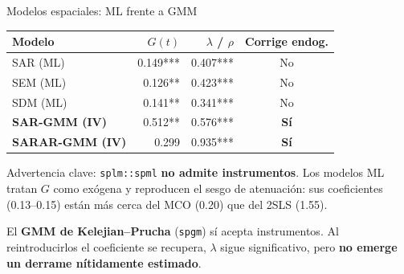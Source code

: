 \documentclass[
  10pt,
  ignorenonframetext,
  aspectratio=169,
  spanish,
]{beamer}
\begin{document}
\begin{frame}[fragile]{Modelos espaciales: ML frente a GMM}
\protect{}\label{modelos-espaciales-ml-frente-a-gmm}
\begin{table}[!h]
\centering\begingroup\fontsize{8}{10}\selectfont

\begin{tabular}[t]{lrrc}
\toprule
Modelo & $G(t)$ & $\lambda$ / $\rho$ & Corrige endog.\\
\midrule
SAR (ML) & 0.149*** & 0.407*** & No\\
SEM (ML) & 0.126** & 0.423*** & No\\
SDM (ML) & 0.141** & 0.341*** & No\\
\textbf{SAR-GMM (IV)} & 0.512** & 0.576*** & \textbf{Sí}\\
\textbf{SARAR-GMM (IV)} & 0.299 & 0.935*** & \textbf{Sí}\\
\bottomrule
\end{tabular}
\endgroup{}
\end{table}

\vspace{0.25cm}

\small

\alert{Advertencia clave:} \texttt{splm::spml} \textbf{no admite
instrumentos}. Los modelos ML tratan \(G\) como exógena y reproducen el
sesgo de atenuación: sus coeficientes (0.13--0.15) están más cerca del
MCO (0.20) que del 2SLS (1.55).

\vspace{0.2cm}

El \textbf{GMM de Kelejian--Prucha} (\texttt{spgm}) sí acepta
instrumentos. Al reintroducirlos el coeficiente se recupera, \(\lambda\)
sigue significativo, pero \textbf{no emerge un derrame nítidamente
estimado}.

\normalsize
\end{frame}
\end{document}
